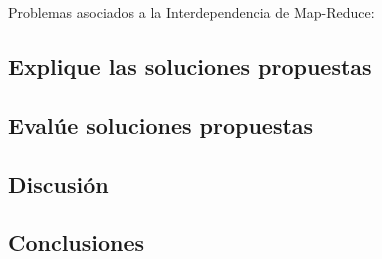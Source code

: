 \documentclass[11pt, a4paper, twoside]{article}
\begin{document}
Problemas asociados a la Interdependencia de Map-Reduce:


\clearpage
\subsection {\footnotesize Explique las soluciones propuestas}
\label{investigacion-6}

\clearpage
\subsection {\footnotesize Evalúe soluciones propuestas}
\label{investigacion-7}

\clearpage
\subsection {\footnotesize Discusión}
\label{investigacion-8}

\clearpage
\subsection {\footnotesize Conclusiones}
\label{investigacion-9}

\clearpage
\end{document}
